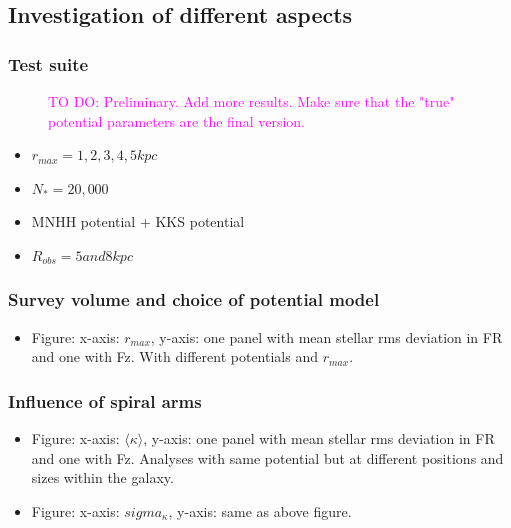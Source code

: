 \documentclass[iop,revtex4,numberedappendix,appendixfloats]{emulateapj}
\newcommand{\Wilma}[1]{\textcolor{Magenta}{#1}}
\begin{document}
\subsection{Investigation of different aspects}

\subsubsection{Test suite}

\begin{figure}[!htbp]
\caption{\Wilma{TO DO: Preliminary. Add more results. Make sure that the "true" potential parameters are the final version.}}
\label{fig:simulation}
\end{figure}

\begin{itemize}
\item $r_{max}=1,2,3,4,5kpc$
\item $N_*=20,000$
\item MNHH potential + KKS potential
\item $R_{obs} =5 and 8 kpc$
\end{itemize}



\subsubsection{Survey volume and choice of potential model}

\begin{itemize}
\item Figure: x-axis: $r_{max}$, y-axis: one panel with mean stellar rms deviation in FR and one with Fz. With different potentials and $r_{max}$.
\end{itemize}

\subsubsection{Influence of spiral arms}

\begin{itemize}
\item Figure: x-axis: $\langle \kappa \rangle$, y-axis: one panel with mean stellar rms deviation in FR and one with Fz. Analyses with same potential but at different positions and sizes within the galaxy.
\item Figure: x-axis: $sigma_\kappa$, y-axis: same as above figure.
\end{itemize}
\end{document}
